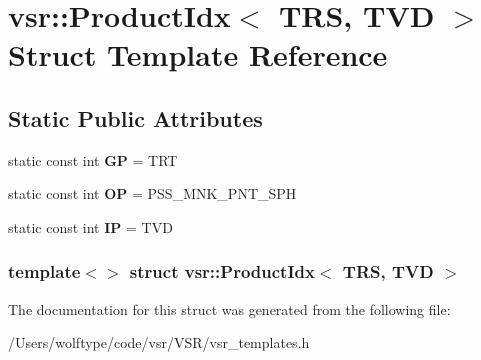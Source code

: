 \hypertarget{structvsr_1_1_product_idx_3_01_t_r_s_00_01_t_v_d_01_4}{\section{vsr\-:\-:Product\-Idx$<$ T\-R\-S, T\-V\-D $>$ Struct Template Reference}
\label{structvsr_1_1_product_idx_3_01_t_r_s_00_01_t_v_d_01_4}
}
\subsection*{Static Public Attributes}
\begin{DoxyCompactItemize}
\item 
\hypertarget{structvsr_1_1_product_idx_3_01_t_r_s_00_01_t_v_d_01_4_a256b65fe14a88f57e2054ab5957c1283}{static const int {\bfseries G\-P} = T\-R\-T}\label{structvsr_1_1_product_idx_3_01_t_r_s_00_01_t_v_d_01_4_a256b65fe14a88f57e2054ab5957c1283}

\item 
\hypertarget{structvsr_1_1_product_idx_3_01_t_r_s_00_01_t_v_d_01_4_a3ab7b0ac613ddf32784afebd14269c91}{static const int {\bfseries O\-P} = P\-S\-S\-\_\-\-M\-N\-K\-\_\-\-P\-N\-T\-\_\-\-S\-P\-H}\label{structvsr_1_1_product_idx_3_01_t_r_s_00_01_t_v_d_01_4_a3ab7b0ac613ddf32784afebd14269c91}

\item 
\hypertarget{structvsr_1_1_product_idx_3_01_t_r_s_00_01_t_v_d_01_4_aa462269f290b16e579af199e6d4d9087}{static const int {\bfseries I\-P} = T\-V\-D}\label{structvsr_1_1_product_idx_3_01_t_r_s_00_01_t_v_d_01_4_aa462269f290b16e579af199e6d4d9087}

\end{DoxyCompactItemize}
\subsubsection*{template$<$$>$ struct vsr\-::\-Product\-Idx$<$ T\-R\-S, T\-V\-D $>$}



The documentation for this struct was generated from the following file\-:\begin{DoxyCompactItemize}
\item 
/\-Users/wolftype/code/vsr/\-V\-S\-R/vsr\-\_\-templates.\-h\end{DoxyCompactItemize}
